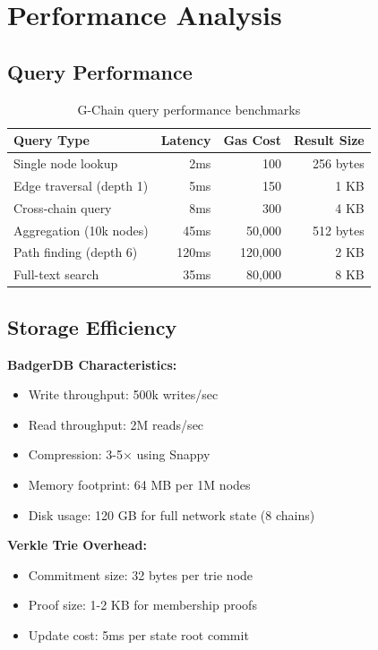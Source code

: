 \section{Performance Analysis}


\subsection{Query Performance}

\begin{table}[h]
\centering
\begin{tabular}{@{}lrrr@{}}
\toprule
\textbf{Query Type} & \textbf{Latency} & \textbf{Gas Cost} & \textbf{Result Size} \\ \midrule
Single node lookup & 2ms & 100 & 256 bytes \\
Edge traversal (depth 1) & 5ms & 150 & 1 KB \\
Cross-chain query & 8ms & 300 & 4 KB \\
Aggregation (10k nodes) & 45ms & 50,000 & 512 bytes \\
Path finding (depth 6) & 120ms & 120,000 & 2 KB \\
Full-text search & 35ms & 80,000 & 8 KB \\ \bottomrule
\end{tabular}
\caption{G-Chain query performance benchmarks}
\end{table}

\subsection{Storage Efficiency}

\textbf{BadgerDB Characteristics:}
\begin{itemize}
\item Write throughput: 500k writes/sec
\item Read throughput: 2M reads/sec
\item Compression: 3-5× using Snappy
\item Memory footprint: 64 MB per 1M nodes
\item Disk usage: 120 GB for full network state (8 chains)
\end{itemize}

\textbf{Verkle Trie Overhead:}
\begin{itemize}
\item Commitment size: 32 bytes per trie node
\item Proof size: 1-2 KB for membership proofs
\item Update cost: 5ms per state root commit
\end{itemize}

